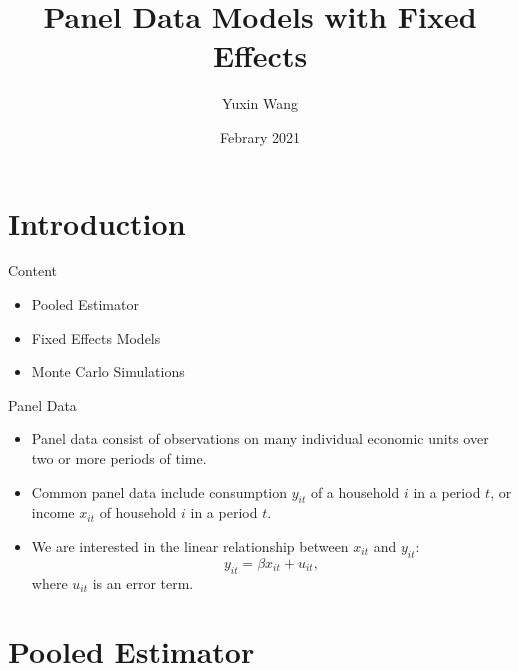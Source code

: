 \documentclass{beamer}
\title{Panel Data Models with Fixed Effects}
\author{Yuxin Wang}
\date{Febrary 2021}
\begin{document}
\maketitle

\section{Introduction}
\begin{frame}{Content}
\begin{itemize}
    \item Pooled Estimator
    \item Fixed Effects Models
    \item Monte Carlo Simulations
\end{itemize}

\end{frame}

\begin{frame}{Panel Data}
    \begin{itemize}
        \item Panel data consist of observations on many individual economic units over two or more periods of time.
        \item Common panel data include consumption $y_{it}$ of a household $i$ in a period $t$, or income $x_{it}$ of household $i$ in a period $t$.
        \item We are interested in the linear relationship between $x_{it}$ and $y_{it}$:
        \[
            y_{it}=\beta x_{it}+u_{it},
        \]
        where $u_{it}$ is an error term.

    \end{itemize}

\end{frame}

\section{Pooled Estimator}

\end{document}
